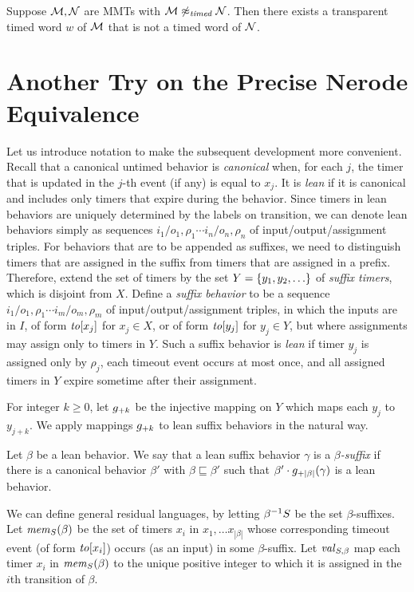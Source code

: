 
\begin{lemma}
\label{not timed}
Suppose ${\mathcal M}, {\mathcal N}$ are MMTs with ${\mathcal M} \not\approx_{\mathit{timed}} {\mathcal N}$.
Then there exists a transparent timed word $w$ of ${\mathcal M}$ that is not a timed word of ${\mathcal N}$.
\end{lemma}



\section{Another Try on the Precise Nerode Equivalence}

Let us introduce notation to make the subsequent development more convenient. 
Recall that a canonical untimed behavior is \emph{canonical} when, for each $j$,
the timer that is updated in the $j$-th event (if any) is equal to $x_j$.
It is {\em lean} if it is canonical and
includes only timers that expire during the behavior. 
Since timers in lean behaviors are uniquely determined by the labels on
transition, we can denote lean behaviors simply as sequences
$i_1/o_1,\rho_1 \cdots i_n/o_n,\rho_n$ of input/output/assignment triples.
For behaviors that are to be appended as suffixes, we need to distinguish
timers that are assigned in the suffix from timers that are assigned in a prefix.
Therefore, extend the set of timers by the set $Y = \lbrace y_1,y_2,\ldots\rbrace$ of
{\em suffix timers}, which is disjoint from $X$.
Define a {\em suffix behavior} to be a sequence
$i_1/o_1,\rho_1 \cdots i_m/o_m,\rho_m$ of input/output/assignment triples,
in which the inputs are in $I$, of form $\mathit{to}[x_j]$ for $x_j \in X$, or
of form $\mathit{to}[y_j]$ for $y_j \in Y$, but where assignments may assign only
to timers in $Y$. Such a suffix behavior is {\em lean} if
timer $y_j$ is assigned only by $\rho_j$, each timeout event occurs at most once, and all assigned timers in $Y$ expire sometime after their assignment.

For integer $k \geq 0$, let $g_{+{k}}$ be the injective mapping on
$Y$ which maps each $y_j$ to $y_{j+k}$.  We apply mappings $g_{+{k}}$ to
lean suffix behaviors in the natural way.

Let $\beta$ be a lean behavior. We say that 
a lean suffix behavior $\gamma$ is a {\em $\beta$-suffix} if
there is a canonical behavior $\beta'$ with $\beta \sqsubseteq \beta'$ such that
$\beta'\cdot g_{+{|\beta|}}(\gamma)$ is a lean behavior.

We can define general residual languages, by letting
${\beta}^{-1}{S}$ be the set $\beta$-suffixes.
Let $\mathit{mem}_{S}(\beta)$ be the set of timers $x_i$ in
$x_1 , \ldots x_{|\beta|}$ whose corresponding timeout event
(of form $\mathit{to}[x_i]$) occurs (as an input) in some $\beta$-suffix.
Let $\mathit{val}_{S,\beta}$ map each timer $x_i$ in
$\mathit{mem}_{S}(\beta)$ to the unique positive integer to which it
is assigned in the $i$th transition of $\beta$.

